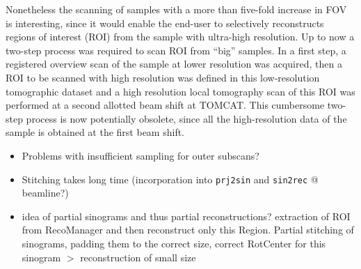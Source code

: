 Nonetheless the scanning of samples with a more than five-fold increase in FOV is interesting, since it would enable the end-user to selectively reconstructs regions of interest (ROI) from the sample with ultra-high resolution. Up to now a two-step process was required to scan ROI from ``big'' samples. In a first step, a registered overview scan of the sample at lower resolution was acquired, then a ROI to be scanned with high resolution was defined in this low-resolution tomographic dataset and a high resolution local tomography scan of this ROI was performed at a second allotted beam shift at TOMCAT. This cumbersome two-step process is now potentially obsolete, since all the high-resolution data of the sample is obtained at the first beam shift.

\begin{itemize}
	\item Problems with insufficient sampling for outer subscans?
	\item Stitching takes long time (incorporation into \verb+prj2sin+ and \verb+sin2rec+ @ beamline?)
	\item idea of partial sinograms and thus partial reconstructions? extraction of ROI from RecoManager and then reconstruct only this Region. Partial stitching of sinograms, padding them to the correct size, correct RotCenter for this sinogram $>$ reconstruction of small size
\end{itemize}